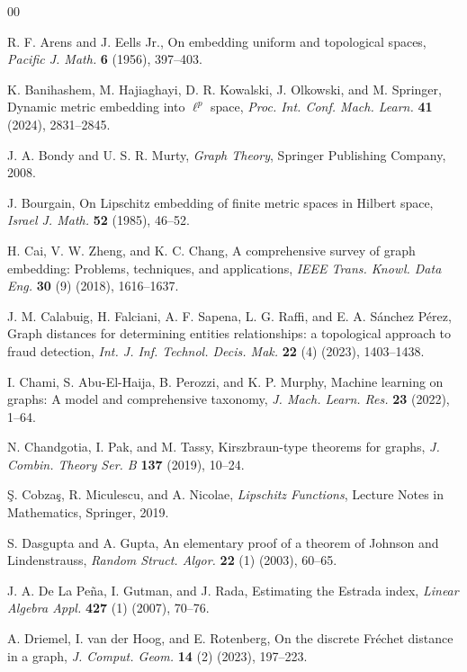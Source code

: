 \documentclass[preprint,12pt]{elsarticle}
\begin{document}
\begin{thebibliography}{00}


 R. F. Arens and J. Eells Jr., On embedding uniform and topological spaces, \textit{Pacific J. Math.} \textbf{6} (1956), 397--403.

 K. Banihashem, M. Hajiaghayi, D. R. Kowalski, J. Olkowski, and M. Springer, Dynamic metric embedding into $\ell^p$ space, \textit{Proc. Int. Conf. Mach. Learn.} \textbf{41} (2024), 2831--2845.

 J. A. Bondy and U. S. R. Murty, \textit{Graph Theory}, Springer Publishing Company, 2008.

 J. Bourgain, On Lipschitz embedding of finite metric spaces in Hilbert space, \textit{Israel J. Math.} \textbf{52} (1985), 46--52.

 H. Cai, V. W. Zheng, and K. C. Chang, A comprehensive survey of graph embedding: Problems, techniques, and applications, \textit{IEEE Trans. Knowl. Data Eng.} \textbf{30} (9) (2018), 1616--1637.

 J. M. Calabuig, H. Falciani, A. F. Sapena, L. G. Raffi, and E. A. Sánchez Pérez, Graph distances for determining entities relationships: a topological approach to fraud detection, \textit{Int. J. Inf. Technol. Decis. Mak.} \textbf{22} (4) (2023), 1403--1438.

 I. Chami, S. Abu-El-Haija, B. Perozzi, and K. P. Murphy, Machine learning on graphs: A model and comprehensive taxonomy, \textit{J. Mach. Learn. Res.} \textbf{23} (2022), 1--64.

N. Chandgotia, I. Pak, and M. Tassy, Kirszbraun-type theorems for graphs, \textit{J. Combin. Theory Ser. B} \textbf{137} (2019), 10--24.

 Ş. Cobzaş, R. Miculescu, and A. Nicolae, \textit{Lipschitz Functions}, Lecture Notes in Mathematics, Springer, 2019.

 S. Dasgupta and A. Gupta, An elementary proof of a theorem of Johnson and Lindenstrauss, \textit{Random Struct. Algor.} \textbf{22} (1) (2003), 60--65.

 J. A. De La Peña, I. Gutman, and J. Rada, Estimating the Estrada index, \textit{Linear Algebra Appl.} \textbf{427} (1) (2007), 70--76.

 A. Driemel, I. van der Hoog, and E. Rotenberg, On the discrete Fréchet distance in a graph, \textit{J. Comput. Geom.} \textbf{14} (2) (2023), 197--223.


\end{thebibliography}
\end{document}
